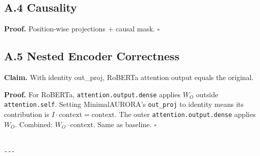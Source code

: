 \subsection{A.4 Causality}

\textbf{Proof.} Position-wise projections + causal mask. $\square$

\subsection{A.5 Nested Encoder Correctness}

\textbf{Claim.} With identity out\_proj, RoBERTa attention output equals the 
original.

\textbf{Proof.} For RoBERTa, \texttt{attention.output.dense} applies $W_O$ outside 
\texttt{attention.self}. Setting MinimalAURORA's \texttt{out\_proj} to identity means 
its contribution is $I \cdot \text{context} = \text{context}$. The outer 
\texttt{attention.output.dense} applies $W_O$. Combined: $W_O \cdot \text{context}$. 
Same as baseline. $\square$
\begin{lstlisting}

---
\end{lstlisting}